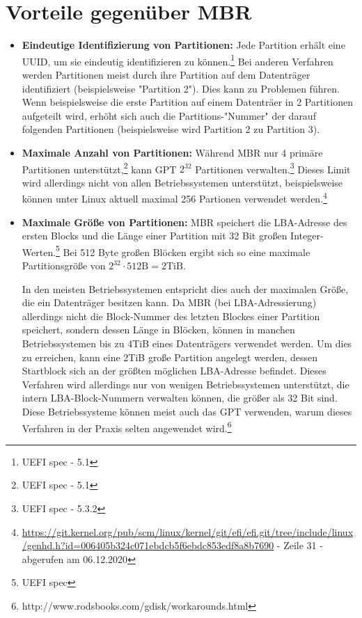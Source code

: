 \section{Vorteile gegenüber MBR}
\label{sec:gpt_advantages}

\begin{itemize}
    \item \textbf{Eindeutige Identifizierung von Partitionen:} 
    Jede Partition erhält eine UUID, um sie eindeutig identifizieren zu können.\footnote{UEFI spec - 5.1}
    Bei anderen Verfahren werden Partitionen meist durch ihre Partition auf dem Datenträger identifiziert (beispielsweise "Partition 2").
    Dies kann zu Problemen führen. 
    Wenn beispielsweise die erste Partition auf einem Datenträer in 2 Partitionen aufgeteilt wird, erhöht sich auch die Partitions-"Nummer" der darauf folgenden Partitionen (beispielsweise wird Partition 2 zu Partition 3).

    \item \textbf{Maximale Anzahl von Partitionen:}
    Während MBR nur 4 primäre Partitionen unterstützt,\footnote{UEFI spec - 5.1} kann GPT $ 2^{32} $ Partitionen verwalten.\footnote{UEFI spec - 5.3.2}
    Dieses Limit wird allerdings nicht von allen Betriebssystemen unterstützt, beispielsweise können unter Linux aktuell maximal 256 Partionen verwendet werden.\footnote{\url{https://git.kernel.org/pub/scm/linux/kernel/git/efi/efi.git/tree/include/linux/genhd.h?id=006405b324c071ebdcb5f6ebdc853edf8a8b7690} - Zeile 31 - abgerufen am 06.12.2020}

    \item \textbf{Maximale Größe von Partitionen:}
    MBR speichert die LBA-Adresse des ersten Blocks und die Länge einer Partition mit 32 Bit großen Integer-Werten.\footnote{UEFI spec}
    Bei 512 Byte großen Blöcken ergibt sich so eine maximale Partitionsgröße von $ 2^{32} \cdot 512 \mathrm{B} = 2 \mathrm{TiB} $.

    In den meisten Betriebssystemen entspricht dies auch der maximalen Größe, die ein Datenträger besitzen kann.
    Da MBR (bei LBA-Adressierung) allerdings nicht die Block-Nummer des letzten Blockes einer Partition speichert, sondern dessen Länge in Blöcken, können in manchen Betriebssystemen bis zu 4TiB eines Datenträgers verwendet werden. 
    Um dies zu erreichen, kann eine 2TiB große Partition angelegt werden, dessen Startblock sich an der größten möglichen LBA-Adresse befindet.
    Dieses Verfahren wird allerdings nur von wenigen Betriebssystemen unterstützt, die intern LBA-Block-Nummern verwalten können, die größer als 32 Bit sind.
    Diese Betriebssysteme können meist auch das GPT verwenden, warum dieses Verfahren in der Praxis selten angewendet wird.\footnote{http://www.rodsbooks.com/gdisk/workarounds.html}


\end{itemize}
